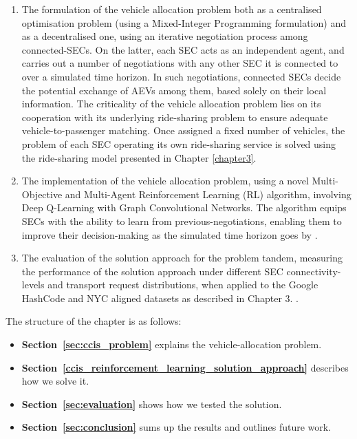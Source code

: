 \begin{enumerate}
    \item The formulation of the vehicle allocation problem both as a centralised optimisation problem (using a
    Mixed-Integer Programming formulation) and as a decentralised one, using an iterative negotiation process
    among connected-SECs. On the latter, each SEC acts as an independent agent, and
    carries out a number of negotiations with any other SEC it is connected to over a simulated time horizon.
    In such negotiations, connected SECs decide the potential exchange of AEVs among them, based solely on their
    local information. The criticality of the vehicle allocation problem lies on its cooperation with its underlying ride-sharing problem to ensure adequate vehicle-to-passenger matching.
    Once assigned a fixed number of vehicles, the problem of each SEC operating its own ride-sharing service is solved using the ride-sharing model presented in Chapter \ref{chapter3}.
    
    \item The implementation of the vehicle allocation problem, using a novel Multi-Objective and Multi-Agent
    Reinforcement Learning (RL) algorithm, involving Deep Q-Learning with Graph Convolutional Networks. The algorithm
    equips SECs with the ability to learn from previous-negotiations,
    enabling them to improve their decision-making as the simulated time horizon goes by \cite{Reference103}.
    
    \item The evaluation of the solution approach for the problem tandem, measuring the performance of the solution approach under different SEC connectivity-levels
    and transport request distributions, when applied to the Google HashCode and NYC aligned datasets as described in Chapter 3. .
\end{enumerate}

The structure of the chapter is as follows:
\begin{itemize}
  \item \textbf{Section~\ref{sec:ccis_problem}} explains the vehicle‑allocation problem.
  \item \textbf{Section~\ref{ccis_reinforcement_learning_solution_approach}} describes how we solve it.
  \item \textbf{Section~\ref{sec:evaluation}} shows how we tested the solution.
  \item \textbf{Section~\ref{sec:conclusion}} sums up the results and outlines future work.
\end{itemize}

